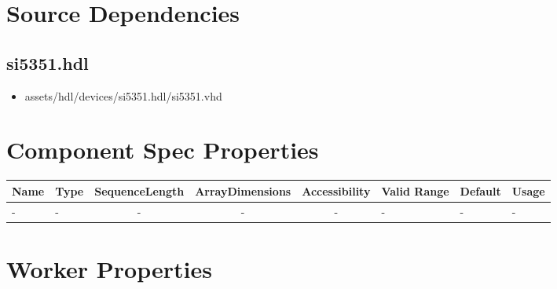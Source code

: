 \documentclass{article}
\def\comp{temp}
\def\comp{si5351}
\begin{document}
\section*{Source Dependencies}
\subsection*{\comp.hdl}
\begin{itemize}
	\item assets/hdl/devices/\comp.hdl/\comp.vhd
\end{itemize}

\begin{landscape}
	\section*{Component Spec Properties}
	\begin{scriptsize}
\begin{tabular}{|p{2cm}|p{1.5cm}|c|c|c|p{1.5cm}|p{1cm}|p{7cm}|}
\hline
\rowcolor{blue}
Name                 & Type   & SequenceLength & ArrayDimensions & Accessibility       & Valid Range & Default & Usage
\\
\hline
- & - & - & - & - & -  & - & -
\\
\hline
\end{tabular}
	\end{scriptsize}

	\section*{Worker Properties}

\end{landscape}
\end{document}
